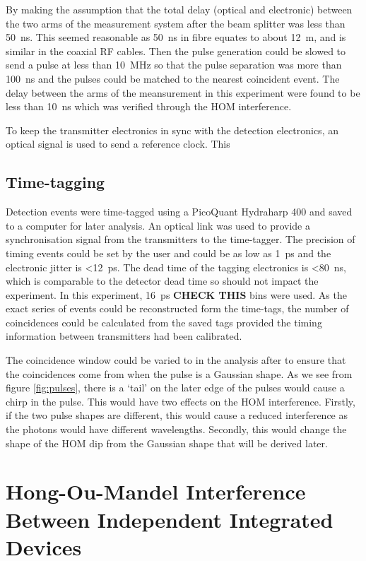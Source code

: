 By making the assumption that the total delay (optical and electronic) between the two arms of the measurement system after the beam splitter was less than \SI{50}{\ns}. This seemed reasonable as \SI{50}{\ns} in fibre equates to about \SI{12}{\m}, and is similar in the coaxial RF cables. Then the pulse generation could be slowed to send a pulse at less than \SI{10}{\MHz} so that the pulse separation was more than \SI{100}{\ns} and the pulses could be matched to the nearest coincident event. The delay between the arms of the meansurement in this experiment were found to be less than \SI{10}{\ns} which was verified through the \ac{HOM} interference.

To keep the transmitter electronics in sync with the detection electronics, an optical signal is used to send a reference clock. This 

\subsection{Time-tagging}

Detection events were time-tagged using a PicoQuant Hydraharp 400 and saved to a computer for later analysis. An optical link was used to provide a synchronisation signal from the transmitters to the time-tagger. The precision of timing events could be set by the user and could be as low as \SI{1}{\ps} and the electronic jitter is \SI{<12}{\ps}. The dead time of the tagging electronics is \SI{<80}{\ns}, which is comparable to the detector dead time so should not impact the experiment. In this experiment, \SI{16}{\ps} \textbf{CHECK THIS} bins were used. As the exact series of events could be reconstructed form the time-tags, the number of coincidences could be calculated from the saved tags provided the timing information between transmitters had been calibrated.

The coincidence window could be varied to in the analysis after to ensure that the coincidences come from when the pulse is a Gaussian shape. As we see from figure \ref{fig:pulses}, there is a `tail' on the later edge of the pulses would cause a chirp in the pulse. This would have two effects on the \ac{HOM} interference. Firstly, if the two pulse shapes are different, this would cause a reduced interference as the photons would have different wavelengths. Secondly, this would change the shape of the \ac{HOM} dip from the Gaussian shape that will be derived later.

\section{Hong-Ou-Mandel Interference Between Independent Integrated Devices}

